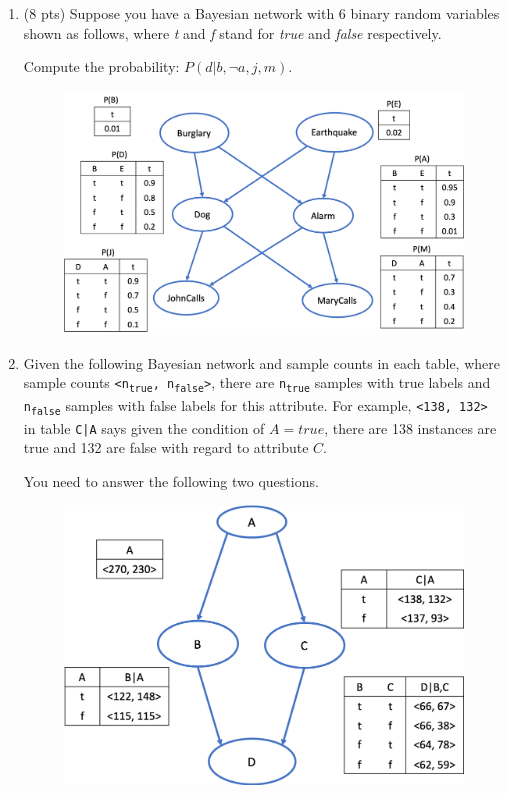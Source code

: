 \documentclass{article}
\begin{document}
\begin{enumerate}
\item (8 pts) Suppose you have a Bayesian network with 6 binary random variables shown as follows, where \emph{t} and \emph{f} stand for \emph{true} and \emph{false} respectively.

Compute the probability: $P(d | b, \neg a, j, m)$.

\begin{figure}[h]
\centering
\includegraphics[scale=0.5]{p1}
\label{fig:q1}
\end{figure}


\pagebreak


\item Given the following Bayesian network and sample counts in each table, where sample counts \texttt{<n\textsubscript{true}, n\textsubscript{false}>}, there are \texttt{n\textsubscript{true}} samples with true labels and \texttt{n\textsubscript{false}} samples with false labels for this attribute. For example, \texttt{<138, 132>} in table \texttt{C|A} says given the condition of $A = true$, there are 138 instances are true and 132 are false with regard to attribute $C$.

You need to answer the following two questions.


\begin{figure}[H]
\centering
\includegraphics[scale=0.5]{p2}
\label{fig:q2}
\end{figure}



\end{enumerate}
\end{document}
